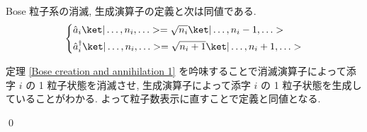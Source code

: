 \documentclass[uplatex,dvipdfmx,a4paper,11pt]{jlreq}
\makeatletter
\numberwithin{equation}{section}
\theoremstyle{definition}
\renewenvironment{proof}[1][\proofname]{\par
  \normalfont
  \topsep6\p@\@plus6\p@ \trivlist
  \item[\hskip\labelsep{\bfseries #1}\@addpunct{\bfseries}]\ignorespaces\quad\par
}{
  \qed\endtrivlist\@endpefalse
}
\renewcommand\proofname{証明}
\makeatother
\begin{document}
\begin{theorem}[Q21-36]
  Bose 粒子系の消滅, 生成演算子の定義と次は同値である.
  \begin{align}
    \begin{dcases}
      \hat{a}_i\ket|\ldots,n_i,\ldots> = \sqrt{n_i}\ket|\ldots,n_i-1,\ldots> \\
      \hat{a}_i^\dagger\ket|\ldots,n_i,\ldots> = \sqrt{n_i+1}\ket|\ldots,n_i+1,\ldots>
    \end{dcases}
  \end{align}
  \label{Bose creation and annihilation 2}
\end{theorem}
\begin{proof}
  定理 \ref{Bose creation and annihilation 1} を吟味することで消滅演算子によって添字 $i$ の 1 粒子状態を消滅させ, 生成演算子によって添字 $i$ の 1 粒子状態を生成していることがわかる. よって粒子数表示に直すことで定義と同値となる.
\end{proof}
\end{document}
